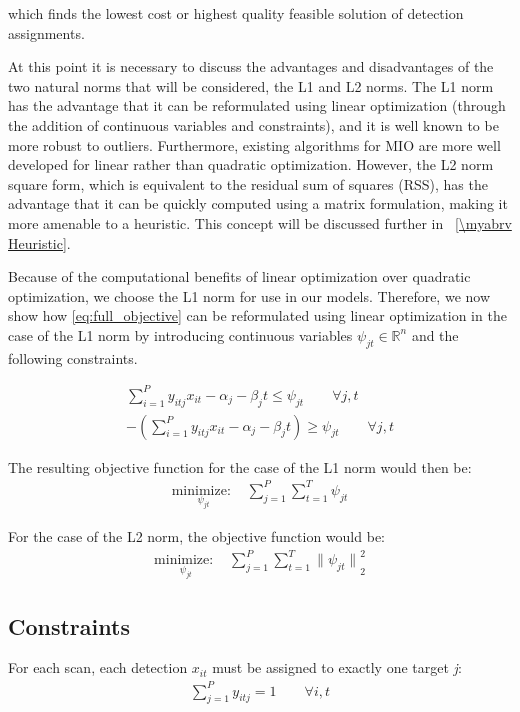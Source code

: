 which finds the lowest cost or highest quality feasible solution of detection assignments.

At this point it is necessary to discuss the advantages and disadvantages of the two natural norms that will be considered, the L1 and L2 norms. The L1 norm has the advantage that it can be reformulated using linear optimization (through the addition of continuous variables and constraints), and it is well known to be more robust to outliers. Furthermore, existing algorithms for MIO are more well developed for linear rather than quadratic optimization. However, the L2 norm square form, which is equivalent to the residual sum of squares (RSS), has the advantage that it can be quickly computed using a matrix formulation, making it more amenable to a heuristic. This concept will be discussed further in \mysection~\ref{\myabrv Heuristic}.

Because of the computational benefits of linear optimization over quadratic optimization, we choose the L1 norm for use in our models. Therefore, we now show how \eqref{eq:full_objective} can be reformulated using linear optimization in the case of the L1 norm by introducing continuous variables $\psi_{jt} \in \mathbb{R}^n$ and the following constraints. 

\begin{align}
\sum_{i=1}^{P}y_{itj}x_{it} - \alpha_{j} - \beta_{j}t \leq \psi_{jt} \qquad \forall j,t\\
-\left(\sum_{i=1}^{P}y_{itj}x_{it} - \alpha_{j} - \beta_{j}t\right) \geq \psi_{jt} \qquad \forall j,t
\end{align}

The resulting objective function for the case of the L1 norm would then be:
\begin{align}
\underset{\psi_{jt}}{\text{minimize: }} & \sum_{j=1}^{P} \sum_{t=1}^{T} \psi_{jt}
\end{align}

For the case of the L2 norm, the objective function would be:
\begin{align}
\underset{\psi_{jt}}{\text{minimize: }} & \sum_{j=1}^{P} \sum_{t=1}^{T} {\|\psi_{jt}\|}^{2}_{2}
\end{align}

\subsection{Constraints}
For each scan, each detection $x_{it}$ must be assigned to exactly one target \textit{j}:
\begin{align}
\sum_{j=1}^{P} y_{itj} = 1 \qquad \forall i,t
\end{align}

